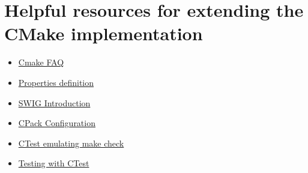\documentclass[a4paper,11pt]{report}
\begin{document}
\section{Helpful resources for extending the CMake implementation}

\begin{itemize}
\item \href{http://www.cmake.org/Wiki/CMake_FAQ}{Cmake FAQ}
\item \href{http://www.cmake.org/cmake/help/v3.0/command/set_target_properties.html}{Properties definition}
\item \href{http://www.swig.org/Doc1.3/Introduction.html}{SWIG Introduction}
\item
  \href{http://www.cmake.org/Wiki/CMake\%3aCPackConfiguration}{CPack
    Configuration}
\item \href{http://www.vtk.org/Wiki/CMakeEmulateMakeCheck}{CTest
  emulating make check}
\item \href{https://cmake.org/Wiki/CMake/Testing_With_CTest}{Testing
  with CTest}
\end{itemize}

{\small
{
  }}
\end{document}
